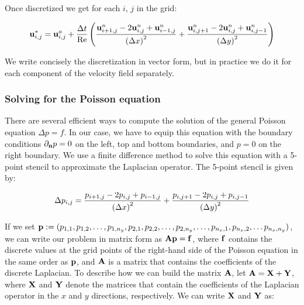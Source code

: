 Once discretized we get for each $i$, $j$ in the grid:

\begin{equation*}
  \boldsymbol{\mathrm{u}}^*_{i,j} = \boldsymbol{\mathrm{u}}^a_{i,j} + \frac{\Delta t}{\mathrm{Re}}\left( \frac{\boldsymbol{\mathrm{u}}^n_{i+1,j} - 2\boldsymbol{\mathrm{u}}^n_{i,j} + \boldsymbol{\mathrm{u}}^n_{i-1,j}}{{(\Delta x)}^2} + \frac{\boldsymbol{\mathrm{u}}^n_{i,j+1} - 2\boldsymbol{\mathrm{u}}^n_{i,j} + \boldsymbol{\mathrm{u}}^n_{i,j-1}}{{(\Delta y)}^2}\right)
\end{equation*}

We write concisely the discretization in vector form, but in practice we do it for each component of the velocity field separately.

\subsubsection*{Solving for the Poisson equation}\label{sec: solvingPoisson}
There are several efficient ways to compute the solution of the general Poisson equation $\Delta p = f$. In our case, we have to equip this equation with the boundary conditions $\partial_{\boldsymbol{\mathrm{n}}}p=0$ on the left, top and bottom boundaries, and $p=0$ on the right boundary. We use a finite difference method to solve this equation with a 5-point stencil to approximate the Laplacian operator. The 5-point stencil is given by:

\begin{equation*}
  \Delta p_{i,j} = \frac{p_{i+1,j} - 2 p_{i,j} + p_{i-1,j}}{{(\Delta x)}^2} + \frac{p_{i,j+1} - 2 p_{i,j} + p_{i,j-1}}{{(\Delta y)}^2}
\end{equation*}

If we set $\boldsymbol{\mathrm{p}}:=(p_{1,1}, p_{1,2}, \ldots, p_{1,n_y}, p_{2,1}, p_{2,2}, \ldots, p_{2,n_y},\ldots, p_{n_x,1},p_{n_x,2},\ldots p_{n_x,n_y})$, we can write our problem in matrix form as $\boldsymbol{\mathrm{A}}\boldsymbol{\mathrm{p}}=\boldsymbol{\mathrm{f}}$, where $\boldsymbol{\mathrm{f}}$ contains the discrete values at the grid points of the right-hand side of the Poisson equation in the same order as $\boldsymbol{\mathrm{p}}$, and $\boldsymbol{\mathrm{A}}$ is a matrix that contains the coefficients of the discrete Laplacian. To describe how we can build the matrix $\boldsymbol{\mathrm{A}}$, let $\boldsymbol{\mathrm{A}}=\boldsymbol{\mathrm{X}} + \boldsymbol{\mathrm{Y}}$, where $\boldsymbol{\mathrm{X}}$ and $\boldsymbol{\mathrm{Y}}$ denote the matrices that contain the coefficients of the Laplacian operator in the $x$ and $y$ directions, respectively. We can write $\boldsymbol{\mathrm{X}}$ and $\boldsymbol{\mathrm{Y}}$ as:

